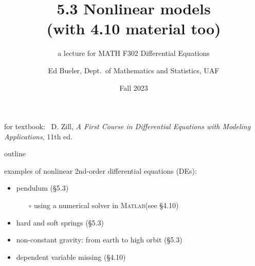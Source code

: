 \documentclass[dvipsnames,colorlinks]{beamer}
\title{5.3 Nonlinear models \\ (with 4.10 material too)}
\subtitle{a lecture for MATH F302 Differential Equations}
\author{Ed Bueler, Dept.~of Mathematics and Statistics, UAF}
\date{Fall 2023}
\newcommand{\Matlab}{\textsc{Matlab}\xspace}
\begin{document}


\begin{frame}
\titlepage

\centerline{\tiny for textbook: \, D. Zill, \emph{A First Course in Differential Equations with Modeling Applications}, 11th ed.}
\end{frame}


\begin{frame}{outline}

examples of \alert{nonlinear} 2nd-order differential equations (DEs):

\begin{itemize}
\item pendulum (\S 5.3)
    \begin{itemize}
    \item[$\circ$] using a numerical solver in \Matlab (see \S4.10)
    \end{itemize}
\item hard and soft springs (\S 5.3)
\item non-constant gravity: from earth to high orbit (\S 5.3)
\item dependent variable missing (\S 4.10)
\end{itemize}
\end{frame}
\end{document}
